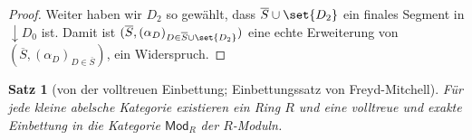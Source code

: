 \documentclass[a4paper, parskip=half]{scrartcl}
\theoremstyle{marginbreak}
\newtheorem{theorem}[remark]{Satz}
\theoremstyle{nonumberplain}
\newtheorem{proof}{Beweis.}
\newtheorem{overview}{Übersicht.}
\newcommand\ccat\mathsf
\newcommand\cat\mathcal
\newcommand{\down}[1]{{\downarrow}#1}
\renewcommand{\o}[1]{\iftoggle{overviews}{#1}{}}
\newcommand{\n}{\pgfmatrixnextcell}
\newcommand\nat\Rightarrow
\DeclareMathOperator{\colim}{colim}
\DeclareMathOperator{\id}{id}
\begin{document}
{\begin{proof}
			Weiter haben wir $D_2$ so gewählt, dass $\overline{S}\cup\set{D_2}$ ein finales
			Segment in $\down{D_0}$ ist. Damit ist $(\overline{S}, (\alpha_D)_{D\in\overline{S}\cup\set{D_2}})$
			eine echte Erweiterung von $(\overline{S}, (\alpha_D)_{D\in\overline{S}})$,
			ein Widerspruch.
		\end{proof}}
		\begin{theorem}[von der volltreuen Einbettung; Einbettungssatz von Freyd-Mitchell]
			Für jede kleine abelsche Kategorie existieren ein Ring $R$ und eine volltreue
			und exakte Einbettung in die Kategorie $\ccat{Mod}_R$ der $R$-Moduln.
		\end{theorem}
		\o{\begin{overview}
			$R\coloneqq\ccat{Nat}(U, U)$. Für $A\in\cat{A}$ ist $U(A)$ durch $r\cdot x\coloneqq r_A(x)$
			ein $R$-Modul. $U(f)$ ist $R$-linear. $V\colon\cat{A}\to\ccat{Mod}_R$ fasst das Bild von $U$
			als $R$-Moduln und $R$-lineare Abbildungen auf; ist treu und exakt, weil $U$ es ist.
			Zeige noch: $V$ ist voll, in mehreren Schritten:
			\begin{itemize}[noitemsep]
				\item Konstruktion des Funktors $\pi\colon\down{\delta_A}\to\cat{A}$ durch
					Kernel Pairs
					\[
						\begin{tikzcd}[column sep=4em]
							\pi(D)
								\ar[shift left]{r}{u_D}
								\ar[shift right, ']{r}{v_D}
								\ar{d}{\pi(D\leq D')} \n
							\phi(D)
								\ar{r}{\phi(D\leq\delta_A)}
								\ar{d}{\phi(D\leq D')} \n
							A
								\ar{d}{\id_A} \\
							\pi(D')
								\ar[shift left]{r}{u_{D'}}
								\ar[shift right, ']{r}{v_{D'}} \n
							\phi(D')
								\ar{r}{\phi(D'\leq\delta_A)} \n
							A
						\end{tikzcd}
					\]
					\begin{itemize}[noitemsep]
						\item Konstruktion von $u, v\colon U\nat P$ und des
							Equalizers $w$
						\begin{gather*}
							\begin{tikzcd}[column sep=6em]
								\cat{A}(\pi D,{-}) \n
								\cat{A}(\phi D, {-})
									\ar[shift right, ']{l}{u_D^*}
									\ar[shift left]{l}{v_D^*} \n
								\cat{A}(A, {-})
									\ar[']{l}{\phi(D\leq\delta_A)^*}
							\end{tikzcd}\\
							\text{\rotatebox[origin=c]{270}{$\leadsto$}}\colim\\
							\begin{tikzcd}

\end{tikzcd}
\end{gather*}
\end{itemize}
\end{itemize}
\end{overview}}
\end{document}
